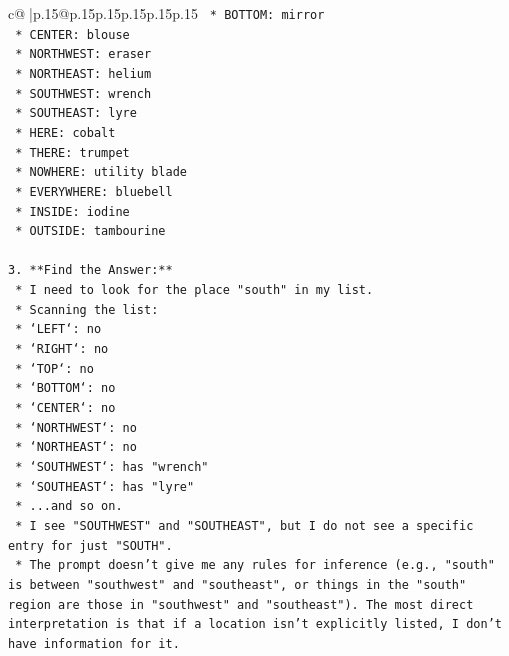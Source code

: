 \documentclass{article}
\begin{document}
{\begin{supertabular}{c@{$\;$}|p{.15\linewidth}@{}p{.15\linewidth}p{.15\linewidth}p{.15\linewidth}p{.15\linewidth}p{.15\linewidth}}
{{{\texttt{        *   BOTTOM: mirror} \\
\texttt{        *   CENTER: blouse} \\
\texttt{        *   NORTHWEST: eraser} \\
\texttt{        *   NORTHEAST: helium} \\
\texttt{        *   SOUTHWEST: wrench} \\
\texttt{        *   SOUTHEAST: lyre} \\
\texttt{        *   HERE: cobalt} \\
\texttt{        *   THERE: trumpet} \\
\texttt{        *   NOWHERE: utility blade} \\
\texttt{        *   EVERYWHERE: bluebell} \\
\texttt{        *   INSIDE: iodine} \\
\texttt{        *   OUTSIDE: tambourine} \\
\\ 
\texttt{3.  **Find the Answer:**} \\
\texttt{    *   I need to look for the place "south" in my list.} \\
\texttt{    *   Scanning the list:} \\
\texttt{        *   `LEFT`: no} \\
\texttt{        *   `RIGHT`: no} \\
\texttt{        *   `TOP`: no} \\
\texttt{        *   `BOTTOM`: no} \\
\texttt{        *   `CENTER`: no} \\
\texttt{        *   `NORTHWEST`: no} \\
\texttt{        *   `NORTHEAST`: no} \\
\texttt{        *   `SOUTHWEST`: has "wrench"} \\
\texttt{        *   `SOUTHEAST`: has "lyre"} \\
\texttt{        *   ...and so on.} \\
\texttt{    *   I see "SOUTHWEST" and "SOUTHEAST", but I do not see a specific entry for just "SOUTH".} \\
\texttt{    *   The prompt doesn't give me any rules for inference (e.g., "south" is between "southwest" and "southeast", or things in the "south" region are those in "southwest" and "southeast"). The most direct interpretation is that if a location isn't explicitly listed, I don't have information for it.} \\
\\ 
}}}
\end{supertabular}}
\end{document}

